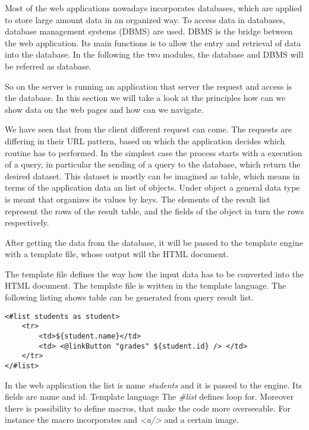 Most of the web applications nowadays incorporates databases, which are applied to store large amount data in an organized way. To access data in databases, database management systems (DBMS) are used. DBMS is the bridge between the web application. Its main functions is to allow the entry and retrieval of data into the database. In the following the two modules, the database and DBMS will be referred as database.  

So on the server is running an application that server the request and access is the database. In this section we will take a look at the principles how can we show data on the web pages and how can we navigate. 


We have seen that from the client different request can come. The requests are differing in their URL pattern, based on which the application decides which routine has to performed. In the simplest case the process starts with a execution of a query, in particular the sending of a query to the database, which return the desired dataset. This dataset is mostly can be imagined as table, which means in terms of the application data an list of objects. Under object a general data type is meant that organizes its values by keys. The elements of the result list represent the rows of the result table, and the fields of the object in turn the rows respectively. 

After getting the data from the database, it will be passed to the template engine with a template file, whose output will the HTML document. 

The template file defines the way how the input data has to be converted into the HTML document. The template file is written in the template language. The following listing shows table can be generated from query result list. 

\begin{lstlisting}[captionpos=b, caption=Template file example, label=skullJSON, belowskip=1em, aboveskip=2em,
basicstyle=\footnotesize,frame=single]
<#list students as student>
	<tr>
		<td>${student.name}</td>
		<td> <@linkButton "grades" ${student.id} /> </td>
	</tr>
</#list>
\end{lstlisting}

In the web application the list is name \textit{students} and it is passed to the engine. Its fields are name and id. Template language The \textit{\#list} defines loop for. Moreover there is possibility to define macros, that make the code more overseeable. For instance the macro \textit{\@linkButton} incorporates and \textit{<a/>} and a certain image.

